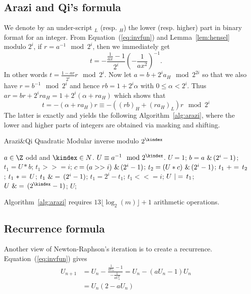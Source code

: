 \subsection{Arazi and Qi's formula}
We denote by an under-script $_L$ (resp. $_H$) the lower (resp. higher)
part in binary format for an integer.
From Equation~(\ref{eq:invfun}) and Lemma~\ref{lem:hensel} modulo $2^i$,
if $r=a^{-1} \mod 2^i$, then we immediately get
$$t=-\frac{ \frac{1}{ax}-1 }{2^i}\left(-\frac{1}{ax^2}\right)^{-1}.$$
In other words 
$t=\frac{1-ar}{2^i}r \mod 2^i$. Now let $a=b+2^i a_H \mod 2^{2i}$ so that we
also have $r=b^{-1} \mod 2^i$ and hence $r b = 1 + 2^i \alpha$ with
$0\leq \alpha < 2^i$. Thus
$a r = b r + 2^i r a_H = 1 +2^i( \alpha + r a_H)$
which shows that 
\begin{equation}\label{eq:arazi}
t =-( \alpha + r a_H)r
     \equiv -\left( \left(r b\right)_H + \left(r a_H\right)_L \right)r\mod 2^i
\end{equation}
The latter is exactly \cite[Theorem~1]{Arazi:2008:CMI} and yields the
following Algorithm~\ref{alg:arazi}, where the lower and higher parts of
integers are obtained via masking and shifting. 
\begin{algorithm}[htbp]
\caption{Arazi\&Qi Quadratic Modular inverse modulo $2^\kindex$}
\label{alg:arazi}
\begin{algorithmic}[1]
\REQUIRE $a \in \Z$ odd and $\kindex \in N$.
\ENSURE $U \equiv a^{-1} \mod 2^\kindex$.
\STATE $U=1$;
\STATE $b = a ~\&\, (2^i-1)$;\hfill{}
\STATE $t_1 = U * b$; $t_1 >>= i$;\hfill{}
\STATE $c = (a >> i) ~\&\, (2^i-1)$;\hfill{}
\STATE $t_2 = (U * c) ~\&\, (2^i-1)$;\hfill{}
\STATE $t_1 ~+=\, t_2$;
\STATE $t_1 ~*=\, U$; $t_1 ~\&=\, (2^i-1)$;\hfill{}
\STATE $t_1 = 2^i-t_1$;\hfill{}
\STATE $t_1 <<= i$;\hfill{}
\STATE $U ~|=\, t_1$;\hfill{}
\ENDFOR
\STATE $U \LOGANDIN (2^\kindex-1)$;\hfill{}
\RETURN $U$;
\end{algorithmic}
\end{algorithm}

\begin{lemma}\label{lem:ara} Algorithm~\ref{alg:arazi} requires $13 \lfloor
  \log_2(m) \rfloor+1$ arithmetic operations.
\end{lemma}






\subsection{Recurrence formula}
Another view of Newton-Raphson's iteration is to create a recurrence. 
Equation~(\ref{eq:invfun}) gives 
\begin{equation}\label{eq:rec}
\begin{split}
U_{n+1} &= U_n - \frac{\frac{1}{aU_n}-1}{-\frac{1}{aU_n^2}} = U_n-(aU_n-1)U_n \\
&= U_n(2-a U_n)
\end{split}
\end{equation}

